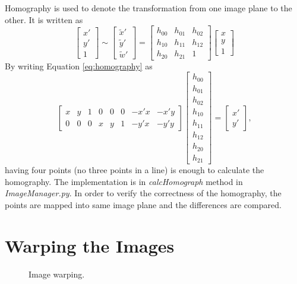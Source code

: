 \documentclass[paper=a4, fontsize=11pt]{scrartcl}
\begin{document}
Homography is used to denote the transformation from one image plane to the other.
It is written as 
\begin{equation}
\label{eq:homography}
\begin{bmatrix}
x' \\
y' \\
1
\end{bmatrix}
\sim
\begin{bmatrix}
\tilde{x}' \\
\tilde{y}' \\
\tilde{w}'
\end{bmatrix}
=
\begin{bmatrix}
h_{00} & h_{01} & h_{02} \\
h_{10} & h_{11} & h_{12} \\
h_{20} & h_{21} & 1 
\end{bmatrix}
\begin{bmatrix}
x \\
y \\
1
\end{bmatrix}
\end{equation}
By writing Equation \ref{eq:homography} as
\begin{equation}
\begin{bmatrix}
x & y & 1 & 0 & 0 & 0 & -x'x & -x'y \\
0 & 0 & 0 & x & y & 1 & -y'x & -y'y
\end{bmatrix}
\begin{bmatrix}
h_{00} \\
h_{01} \\
h_{02} \\
h_{10} \\
h_{11} \\
h_{12} \\
h_{20} \\
h_{21} 
\end{bmatrix}
=
\begin{bmatrix}
x' \\ y'
\end{bmatrix},
\end{equation}
having four points (no three points in a line) is enough to calculate the homography. 
The implementation is in \emph{calcHomograph} method in \emph{ImageManager.py}.
In order to verify the correctness of the homography, the points are mapped into same image plane and the differences are compared.



\section{Warping the Images}
\begin{figure}[h]
\centering
{} 
\caption{Image warping.}
\label{fig:warping}
\end{figure}
\end{document}
